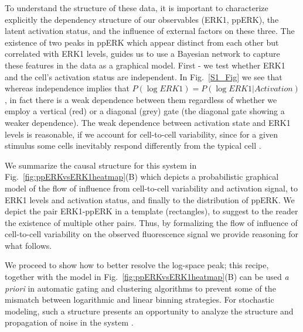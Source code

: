 \documentclass[11pt,a4paper,final]{article}
\begin{document}
To understand the structure of these data, it is important to characterize explicitly the dependency structure of our observables (ERK1, ppERK), the latent activation status, and the influence of external factors on these three. The existence of two peaks in ppERK which appear distinct from each other but correlated with ERK1 levels, guides us to use a Bayesian network to capture these features in the data as a graphical model. First - we test whether ERK1 and the cell's activation status are independent. In Fig.~\ref{S1_Fig} we see that whereas independence implies that $P(\log ERK1) = P(\log ERK1 \vert Activation)$, in fact there is a weak dependence between them regardless of whether we employ a vertical (red) or a diagonal (grey) gate (the diagonal gate showing a weaker dependence). The weak dependence between activation state and ERK1 levels is reasonable, if we account for cell-to-cell variability, since for a given stimulus some cells inevitably respond differently from the typical cell \cite{Spencer2009}. 
\smallskip

We summarize the causal structure for this system in Fig.~\ref{fig:ppERKvsERK1heatmap}(B) which depicts a probabilistic graphical model \cite{Koller2009} of the flow of influence from cell-to-cell variability and activation signal, to ERK1 levels and activation status, and finally to the distribution of ppERK. We depict the pair ERK1-ppERK in a template (rectangles), to suggest to the reader the existence of multiple other pairs. Thus, by formalizing the flow of influence of cell-to-cell variability on the observed fluorescence signal we provide reasoning for what follows.
\smallskip

We proceed to show how to better resolve the log-space peak; this recipe, together with the model in Fig.~\ref{fig:ppERKvsERK1heatmap}(B) can be used \emph{a priori} in automatic gating and clustering algorithms to prevent some of the mismatch between logarithmic and linear binning strategies. For stochastic modeling, such a structure presents an opportunity to analyze the structure and propagation of noise in the system \cite{Prill2015,Ching2017}.
\smallskip
\end{document}
